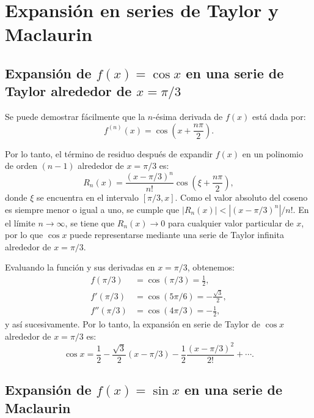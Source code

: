 \documentclass{article}
\begin{document}
\section*{Expansión en series de Taylor y Maclaurin}

\subsection*{Expansión de $f(x) = \cos x$ en una serie de Taylor alrededor de $x = \pi/3$}

Se puede demostrar fácilmente que la $n$-ésima derivada de $f(x)$ está dada por:
\begin{equation}
    f^{(n)}(x) = \cos \left( x + \frac{n \pi}{2} \right).
\end{equation}

Por lo tanto, el término de residuo después de expandir $f(x)$ en un polinomio de orden $(n-1)$ alrededor de $x = \pi/3$ es:
\begin{equation}
    R_n(x) = \frac{(x - \pi/3)^n}{n!} \cos \left( \xi + \frac{n \pi}{2} \right),
\end{equation}
donde $\xi$ se encuentra en el intervalo $[\pi/3, x]$. Como el valor absoluto del coseno es siempre menor o igual a uno, se cumple que $|R_n(x)| < |(x - \pi/3)^n|/n!$. En el límite $n \to \infty$, se tiene que $R_n(x) \to 0$ para cualquier valor particular de $x$, por lo que $\cos x$ puede representarse mediante una serie de Taylor infinita alrededor de $x = \pi/3$.

Evaluando la función y sus derivadas en $x = \pi/3$, obtenemos:
\begin{align*}
    f(\pi/3) &= \cos(\pi/3) = \frac{1}{2}, \\
    f'(\pi/3) &= \cos(5\pi/6) = -\frac{\sqrt{3}}{2}, \\
    f''(\pi/3) &= \cos(4\pi/3) = -\frac{1}{2},
\end{align*}
y así sucesivamente. Por lo tanto, la expansión en serie de Taylor de $\cos x$ alrededor de $x = \pi/3$ es:
\begin{equation}
    \cos x = \frac{1}{2} - \frac{\sqrt{3}}{2} (x - \pi/3) - \frac{1}{2} \frac{(x - \pi/3)^2}{2!} + \cdots.
\end{equation}

\subsection*{Expansión de $f(x) = \sin x$ en una serie de Maclaurin}
\end{document}
